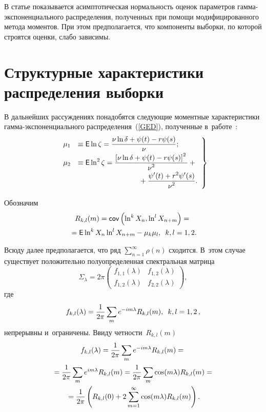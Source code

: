 \begin{multicols}{2}
В статье показывается асимп\-то\-ти\-че\-ская нор\-маль\-ность оценок па\-ра\-мет\-ров гам\-ма-экс\-по\-нен\-ци\-аль\-но\-го 
рас\-пре\-де\-ле\-ния, полученных при помощи модифицированного метода 
моментов. При этом предполагается, что компоненты вы\-бор\-ки, по которой строятся 
оцен\-ки, слабо за\-ви\-симы.


\section{Структурные характеристики распределения выборки}

В дальнейших рас\-суж\-де\-ни\-ях понадобятся сле\-ду\-ющие мо\-мент\-ные характеристики 
гам\-ма-экс\-по\-нен\-ци\-аль\-но\-го рас\-пре\-де\-ле\-ния~(\ref{GED}), полученные в~работе~\cite{KuShe2020}:
\begin{equation}
\left.
\begin{array}{rl}
\mu_1&\equiv\e\ln \zeta=\fr{\nu\ln\delta+\psi(t)-r\psi(s)}{\nu};
\\[6pt]
\mu_2&\equiv\e\ln^2 \zeta=
\fr{\left[\nu\ln\delta+\psi(t)-r\psi(s)\right]^2}{\nu^2}+{}\\
&\hspace*{30mm}{}+\fr{\psi'(t)+r^2\psi'(s)}{\nu^2}.
\end{array}
\right\}
\label{E_ln}
\end{equation}

Обозначим
\begin{multline*}
R_{k,l}(m)={\sf cov}\left(\ln^kX_n,\ln^lX_{n+m}\right)={}\\
{}={\sf E}\ln^kX_n\ln^lX_{n+m}-\mu_k\mu_l,\enskip k,l=1,2.
\end{multline*}

Всюду далее предполагается, что ряд $\sum\nolimits_{n=1}^\infty\rho(n)$ сходится. В~этом 
случае существует положительно по\-лу\-опре\-де\-лен\-ная спект\-раль\-ная мат\-ри\-ца~\cite{JeWa1972, Ibragimov1975}
\begin{equation}
\label{Sigma}
\Sigma_\lambda=2\pi\begin{pmatrix}
f_{1,1}(\lambda)
&
f_{1,2}(\lambda)
\\[3pt]
f_{1,2}(\lambda)
&
f_{2,2}(\lambda)
\end{pmatrix},
\end{equation}
где
$$
f_{k,l}(\lambda)=\displaystyle\frac{\displaystyle 1\mathstrut}{\displaystyle 2\pi\mathstrut}\sum\limits_me^{-im\lambda}R_{k,l}(m),\enskip k,l=1,2\,,
$$
непрерывны и~ограничены. Ввиду чет\-ности~$R_{k,l}(m)$
\begin{multline*}
f_{k,l}(\lambda)=\displaystyle\frac{\displaystyle 1\mathstrut}{\displaystyle 2\pi\mathstrut}\sum\limits_me^{-im\lambda}R_{k,l}(m)={}\\
{}=
\displaystyle\frac{\displaystyle 1\mathstrut}{\displaystyle 2\pi\mathstrut}\sum\limits_me^{im\lambda}R_{k,l}(m)=
\displaystyle\frac{\displaystyle 1\mathstrut}{\displaystyle 2\pi\mathstrut}\sum\limits_m\cos(m\lambda)R_{k,l}(m)={}\\
{}=
\displaystyle\frac{\displaystyle 1\mathstrut}{\displaystyle 2\pi\mathstrut}\left(R_{k,l}(0)+2\sum\limits_{m=1}^\infty\cos(m\lambda)R_{k,l}(m)\right).
\end{multline*}


\end{multicols}
